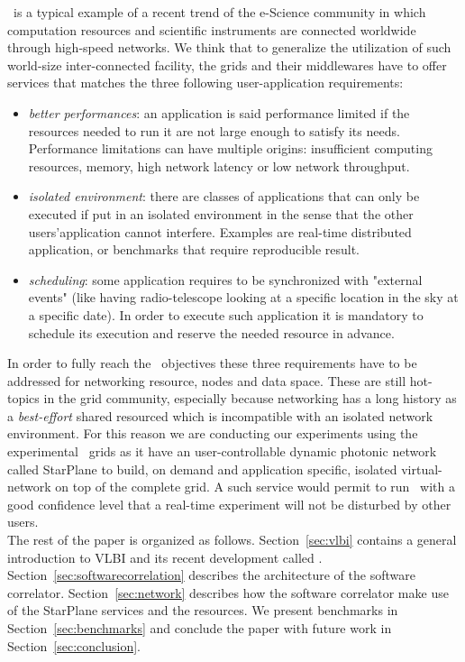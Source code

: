 \scarie\ is a typical example of a recent trend of the e-Science 
community in which computation resources and scientific instruments 
are connected worldwide through high-speed networks. We think that to 
generalize the utilization of such world-size inter-connected facility, 
the grids and their middlewares have to offer services that matches the three
following user-application requirements:
\begin{itemize}
\item \emph{better performances}: an application is said performance
  limited if the resources needed to run it are not large enough to
  satisfy its needs. Performance limitations can have multiple
  origins: insufficient computing resources, memory, high network
  latency or low network throughput.
  
\item \emph{isolated environment}: there are classes of applications
  that can only be executed if put in an isolated environment in the 
  sense that the other users'application cannot interfere. Examples are 
  real-time distributed application, or benchmarks that require reproducible
  result. 

\item \emph{scheduling}: some application requires to be synchronized
  with "external events" (like having radio-telescope looking at a
  specific location in the sky at a specific date). In order to
  execute such application it is mandatory to schedule its execution 
  and reserve the needed resource in advance.
\end{itemize}
In order to fully reach the \scarie\ objectives these three
requirements have to be addressed for networking resource, nodes and
data space. These are still hot-topics in the grid community,
especially because networking has a long history as a
\emph{best-effort} shared resourced which is incompatible with an
isolated network environment. For this reason we are conducting our
experiments using the experimental \ grids as it have an
user-controllable dynamic photonic network called StarPlane to build,
on demand and application specific, isolated virtual-network on top of
the complete grid. A such service would permit to run \scarie\ with a
good confidence level that a real-time
experiment will not be disturbed by other users. \\

The rest of the paper is organized as follows. Section~\ref{sec:vlbi}
contains a general introduction to VLBI and its recent development 
called \evlbi. Section~\ref{sec:softwarecorrelation} describes the 
architecture of the software correlator. Section~\ref{sec:network} 
describes how the software correlator make use of the StarPlane services 
and the  resources. We present benchmarks in Section~\ref{sec:benchmarks} 
and conclude the paper with future work in Section~\ref{sec:conclusion}.


